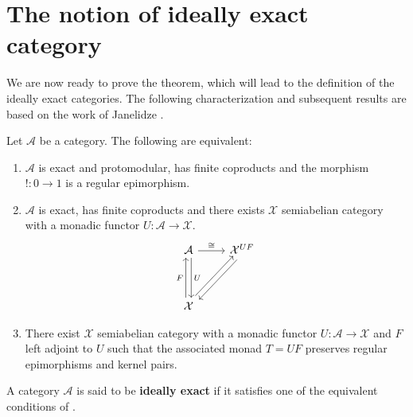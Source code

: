 \section{The notion of ideally exact category}

We are now ready to prove the theorem, which will lead to the definition of the ideally exact categories. The following characterization and subsequent results are based on the work of Janelidze \cite{Janelidze2024}.

\begin{mainbox}{}
    \begin{theo}\label{Ideally exact categories}
        Let $\mathcal{A}$ be a category. The following are equivalent:
        \begin{enumerate}
            \item $\mathcal{A}$ is exact and protomodular, has finite coproducts and the morphism $!:0 \to 1$ is a regular epimorphism.
            \item $\mathcal{A}$ is exact, has finite coproducts and there exists $\mathcal{X}$ semiabelian category with a monadic functor $U: \mathcal{A} \to \mathcal{X}$.
            \[
\begin{tikzcd}
    \mathcal{A} \arrow[dd, "U", shift left] \arrow[r, "\cong"]      & \mathcal{X}^{UF} \arrow[ldd, shift left] \\
                                                                    &                                          \\
    \mathcal{X} \arrow[uu, "F", shift left] \arrow[ruu, shift left] &                                         
    \end{tikzcd}
            \]
            \item There exist $\mathcal{X}$ semiabelian category with a monadic functor $U: \mathcal{A} \to \mathcal{X}$ and $F$ left adjoint to $U$ such that the associated monad $T=UF$ preserves regular epimorphisms and kernel pairs.
        \end{enumerate}
    \end{theo}
\end{mainbox}

\begin{mainbox}{}
    \begin{defi}
        A category $\mathcal{A}$ is said to be \textbf{ideally exact} if it satisfies one of the equivalent conditions of .
    \end{defi}
\end{mainbox}

